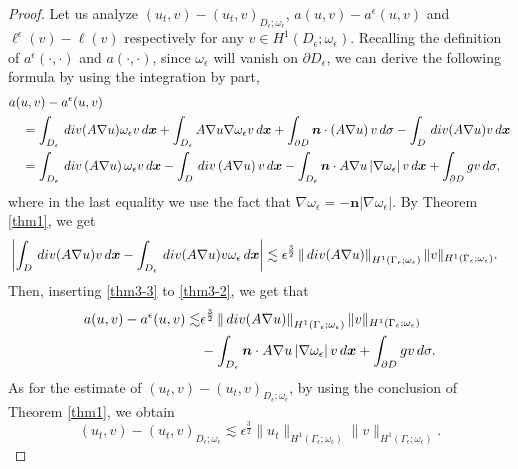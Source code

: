 \documentclass[10pt,a4paper]{amsart}
\newcommand{\dd}{\,{\rm d}}
\newcommand{\divo}{\,{\rm div}}
\begin{document}
\begin{proof}
	Let us analyze $\left(u_t,v\right)-\left(u_t,v\right)_{D_{\epsilon};\omega_{\epsilon}}$, $a(u,v)-a^{\epsilon}(u,v)$ and $\ell^{\epsilon}(v)-\ell(v)$ respectively for any $v \in H^1(D_{\epsilon};\omega_{\epsilon})$. 
	Recalling the definition of $a^{\epsilon}(\cdot,\cdot)$ and $a(\cdot,\cdot)$, since $\omega_{\epsilon}$ will vanish on  $\partial D_{\epsilon}$, we can derive the following formula by using the integration by part,
	{\small\begin{equation}\label{thm3-2}
			\begin{aligned}
				&a(u,v)-a^{\epsilon}(u,v)\\
				&\quad=\int_{D_{\epsilon}} \divo(A\nabla u)\omega_{\epsilon}v\dd\bm x+\int_{D_{\epsilon}} A\nabla u\nabla \omega_{\epsilon} v\dd \bm x+\int_{\partial D} \bm n\cdot \left(A\nabla u\right)v\dd \sigma-\int_D\divo(A\nabla u)v\dd \bm x\\
				&\quad=\int_{D_{\epsilon}}\divo\left(A\nabla u\right)\omega_{\epsilon} v\dd\bm x-\int_D\divo\left(A\nabla u\right)v\dd \bm x-\int_{D_{\epsilon}} \bm n\cdot A\nabla u\left|\nabla \omega_{\epsilon}\right|v\dd \bm x+\int_{\partial D} gv\dd \sigma,
			\end{aligned}
	\end{equation}}
	where in the last equality we use the fact that $\nabla \omega_{\epsilon}=-\bm n\left|\nabla \omega_{\epsilon}\right|$. By Theorem \ref{thm1}, we get
	\begin{align}
		\label{thm3-3}
		&\left|\int_D \divo(A\nabla u)v\dd \bm x-\int_{D_{\epsilon}} \divo(A\nabla u)v\omega_{\epsilon}\dd \bm x\right|
		\lesssim \epsilon^{\frac 3 2}\left\|\divo(A\nabla u)\right\|_{H^1(\Gamma_{\epsilon};\omega_{\epsilon})}\|v\|_{H^1(\Gamma_{\epsilon};\omega_{\epsilon})}.
	\end{align}
	Then, inserting \eqref{thm3-3} to \eqref{thm3-2}, we get that
	\begin{equation}
		\label{thm3-4}
		\begin{aligned}
			a(u,v)-a^{\epsilon}(u,v)\lesssim& \epsilon^{\frac 3 2}\left\|\divo(A\nabla u)\right\|_{H^1(\Gamma_{\epsilon};\omega_{\epsilon})}\|v\|_{H^1(\Gamma_{\epsilon};\omega_{\epsilon})}\\
			&-\int_{D_{\epsilon}} \bm n\cdot A\nabla u\left|\nabla \omega_{\epsilon}\right|v\dd \bm x+\int_{\partial D} gv\dd \sigma.
		\end{aligned}
	\end{equation}
	As for the estimate of $\left(u_t,v\right)-\left(u_t,v\right)_{D_{\epsilon};\omega_{\epsilon}}$, by using the conclusion of Theorem \ref{thm1}, we obtain
	\begin{equation}
		\label{thm3-5}
		\left(u_t,v\right)-\left(u_t,v\right)_{D_{\epsilon};\omega_{\epsilon}}\lesssim \epsilon^{\frac 3 2}\|u_t\|_{H^1(\Gamma_{\epsilon};\omega_{\epsilon})}\|v\|_{H^1(\Gamma_{\epsilon};\omega_{\epsilon})}.
	\end{equation}
	

\end{proof}
\end{document}
